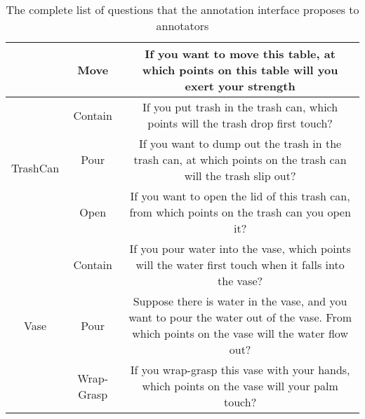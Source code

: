 \documentclass[final]{cvpr}
\begin{document}
\begin{table*}[t]
{\begin{tabular}{c|c|c}
                                      & Move                & If you want to move this table, at which points on this table will you exert your strength                                                       \\ \hline
    \multirow{3}{*}{TrashCan}         & Contain             & If you put trash in the trash can, which points will the trash drop first touch?                                                                 \\
                                      & Pour                & If you want to dump out the trash in the trash can, at which points on the trash can will the trash slip out?                                    \\
                                      & Open                & If you want to open the lid of this trash can, from which points on the trash can you open it?                                                   \\ \hline
    \multirow{3}{*}{Vase}             & Contain             & If you pour water into the vase, which points will the water first touch when it falls into the vase?                                            \\
                                      & Pour                & Suppose there is water in the vase, and you want to pour the water out of the vase. From which points on the vase will the water flow out?       \\
                                      & Wrap-Grasp          & If you wrap-grasp this vase with your hands, which points on the vase will your palm touch?                                                      \\ \hline
    \end{tabular}}
    \caption{The complete list of questions that the annotation interface proposes to annotators}
    \label{complete question list}
\end{table*}
\end{document}
